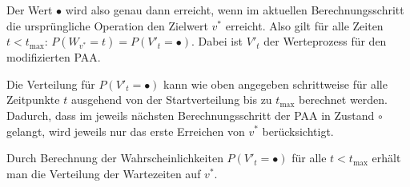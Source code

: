 Der Wert $\bullet$ wird also genau dann erreicht, wenn im aktuellen Berechnungsschritt die ursprüngliche Operation den Zielwert $v^*$ erreicht. Also gilt für alle Zeiten $t < t_{\text{max}}$: $P(W_{v^*} = t) = P(V'_t = \bullet)$. Dabei ist $V'_t$ der Werteprozess für den modifizierten PAA.

Die Verteilung für $P(V'_{t} = \bullet)$ kann wie oben angegeben schrittweise für alle Zeitpunkte $t$ ausgehend von der Startverteilung bis zu $t_{\text{max}}$ berechnet werden. Dadurch, dass im jeweils nächsten Berechnungsschritt der PAA in Zustand $\circ$ gelangt, wird jeweils nur das erste Erreichen von $v^*$ berücksichtigt.

Durch Berechnung der Wahrscheinlichkeiten $P(V'_{t} = \bullet)$ für alle $t < t_{\text{max}}$ erhält man die Verteilung der Wartezeiten auf $v^*$.


